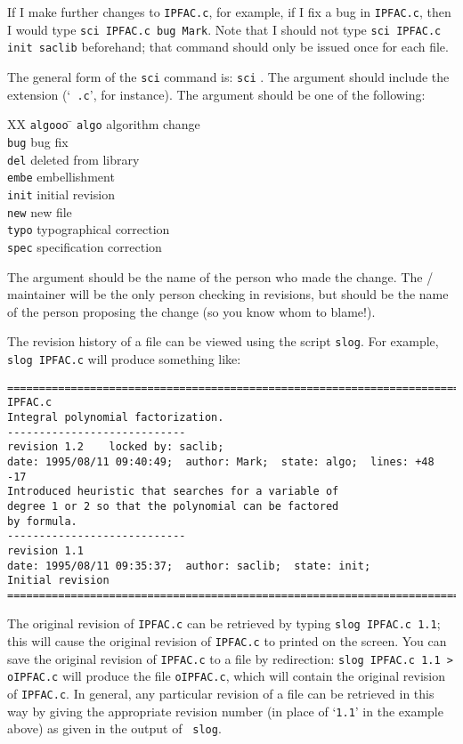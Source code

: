 If I make further changes to {\tt IPFAC.c}, for example, if I
fix a bug in {\tt IPFAC.c}, then I would type {\tt sci IPFAC.c
bug Mark}.  Note that I should not type {\tt sci IPFAC.c init
saclib} beforehand; that command should only be issued once for
each file.


The general form of the {\tt sci} command is:
 {\tt sci}   .
The argument  should include the extension (`{\tt
.c}', for instance).
The argument  should be one of the following:
\begin{tabbing}
XX \= {\tt algooo} \= \kill
\> {\tt algo}   \>  algorithm change\\
\> {\tt bug}    \>  bug fix\\
\> {\tt del}    \>  deleted from library\\
\> {\tt embe}   \>  embellishment\\
\> {\tt init}   \>  initial revision\\
\> {\tt new}    \>  new file\\
\> {\tt typo}   \>  typographical correction\\
\> {\tt spec}   \>  specification correction
\end{tabbing}
The argument  should be the name of the person who
made the change.  The \SACLIB/ maintainer will be the only
person checking in revisions, but  should be the
name of the person proposing the change (so you know whom to
blame!).


The revision history of a file can be viewed using the script
{\tt slog}.  For example, {\tt slog IPFAC.c} will produce
something like:
{\small
\begin{verbatim}
=============================================================================
IPFAC.c
Integral polynomial factorization.
----------------------------
revision 1.2    locked by: saclib;
date: 1995/08/11 09:40:49;  author: Mark;  state: algo;  lines: +48 -17
Introduced heuristic that searches for a variable of
degree 1 or 2 so that the polynomial can be factored
by formula.
----------------------------
revision 1.1
date: 1995/08/11 09:35:37;  author: saclib;  state: init;
Initial revision
=============================================================================
\end{verbatim}
}

The original revision of {\tt IPFAC.c} can be retrieved by typing
{\tt slog IPFAC.c 1.1}; this will cause the original revision of
{\tt IPFAC.c} to printed on the screen.
You can save the original revision of {\tt IPFAC.c} to a file by
redirection: {\tt slog IPFAC.c 1.1 > oIPFAC.c} will produce the
file {\tt oIPFAC.c}, which will contain the original revision of
{\tt IPFAC.c}.
In general, any particular revision of a file can be retrieved in
this way by giving the appropriate revision number (in place of
`{\tt 1.1}' in the example above) as given in the output of {\tt
slog}.


